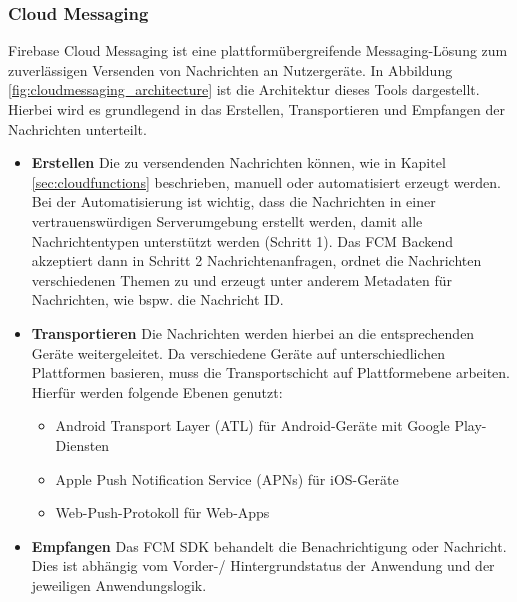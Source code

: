 \subsubsection{Cloud Messaging}
Firebase Cloud Messaging ist eine plattformübergreifende Messaging-Lösung zum zuverlässigen Versenden von Nachrichten an Nutzergeräte.
In Abbildung \ref{fig:cloudmessaging_architecture} ist die Architektur dieses Tools dargestellt.
Hierbei wird es grundlegend in das Erstellen, Transportieren und Empfangen der Nachrichten unterteilt.\cite{firebase2021}\\
\begin{itemize}
	\item \textbf{Erstellen} Die zu versendenden Nachrichten können, wie in Kapitel \ref{sec:cloudfunctions} beschrieben, manuell oder automatisiert erzeugt werden. 
	Bei der Automatisierung ist wichtig, dass die Nachrichten in einer vertrauenswürdigen Serverumgebung erstellt werden, damit alle Nachrichtentypen unterstützt werden (Schritt 1). 
	Das FCM Backend akzeptiert dann in Schritt 2 Nachrichtenanfragen, ordnet die Nachrichten verschiedenen Themen zu und erzeugt unter anderem Metadaten für Nachrichten, wie bspw. die Nachricht ID. 
	\item \textbf{Transportieren} Die Nachrichten werden hierbei an die entsprechenden Geräte weitergeleitet.
	Da verschiedene Geräte auf unterschiedlichen Plattformen basieren, muss die Transportschicht auf Plattformebene arbeiten.
	Hierfür werden folgende Ebenen genutzt:
	\begin{itemize}
		\item Android Transport Layer (ATL) für Android-Geräte mit Google Play-Diensten
		\item Apple Push Notification Service (APNs) für iOS-Geräte
		\item Web-Push-Protokoll für Web-Apps
	\end{itemize}
	\item \textbf{Empfangen} Das FCM SDK behandelt die Benachrichtigung oder Nachricht. Dies ist abhängig vom Vorder-/ Hintergrundstatus der Anwendung und der jeweiligen Anwendungslogik.
\end{itemize}


